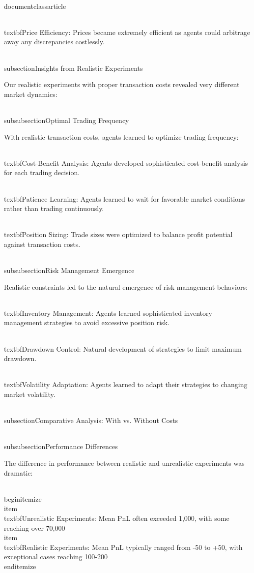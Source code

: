 \\documentclass{article}
\begin{document}
\\textbf{Price Efficiency}: Prices became extremely efficient as agents could arbitrage away any discrepancies costlessly.

\\subsection{Insights from Realistic Experiments}

Our realistic experiments with proper transaction costs revealed very different market dynamics:

\\subsubsection{Optimal Trading Frequency}

With realistic transaction costs, agents learned to optimize trading frequency:

\\textbf{Cost-Benefit Analysis}: Agents developed sophisticated cost-benefit analysis for each trading decision.

\\textbf{Patience Learning}: Agents learned to wait for favorable market conditions rather than trading continuously.

\\textbf{Position Sizing}: Trade sizes were optimized to balance profit potential against transaction costs.

\\subsubsection{Risk Management Emergence}

Realistic constraints led to the natural emergence of risk management behaviors:

\\textbf{Inventory Management}: Agents learned sophisticated inventory management strategies to avoid excessive position risk.

\\textbf{Drawdown Control}: Natural development of strategies to limit maximum drawdown.

\\textbf{Volatility Adaptation}: Agents learned to adapt their strategies to changing market volatility.

\\subsection{Comparative Analysis: With vs. Without Costs}

\\subsubsection{Performance Differences}

The difference in performance between realistic and unrealistic experiments was dramatic:

\\begin{itemize}
\\item \\textbf{Unrealistic Experiments}: Mean PnL often exceeded 1,000, with some reaching over 70,000
\\item \\textbf{Realistic Experiments}: Mean PnL typically ranged from -50 to +50, with exceptional cases reaching 100-200
\\end{itemize}
\end{document}
